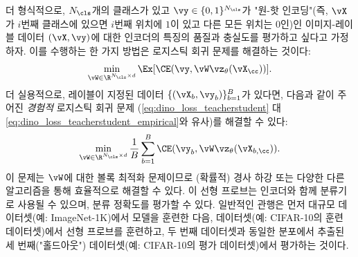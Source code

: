 \documentclass[../../book-main_ko.tex]{subfiles}
\begin{document}
더 형식적으로, \(N_{\cls}\)개의 클래스가 있고 \(\vy \in \{0, 1\}^{N_{\cls}}\)가 "원-핫 인코딩"(즉, \(\vX\)가 \(i\)번째 클래스에 있으면 \(i\)번째 위치에 \(1\)이 있고 다른 모든 위치는 \(0\)인)인 이미지-레이블 데이터 \((\vX, \vy)\)에 대한 인코더의 특징의 품질과 충실도를 평가하고 싶다고 가정하자. 이를 수행하는 한 가지 방법은 로지스틱 회귀 문제를 해결하는 것이다:
\begin{equation}\label{eq:linear_probing}
    \min_{\vW \in \R^{N_{\cls} \times d}}\Ex[\CE(\vy, \vW \vz_{\theta}(\vX_{\cc}))].
\end{equation}
더 실용적으로, 레이블이 지정된 데이터 \(\{(\vX_{b}, \vy_{b})\}_{b = 1}^{B}\)가 있다면, 다음과 같이 주어진 \textit{경험적} 로지스틱 회귀 문제 (\eqref{eq:dino_loss_teacherstudent} 대 \eqref{eq:dino_loss_teacherstudent_empirical}와 유사)를 해결할 수 있다:
\begin{equation}\label{eq:linear_probing_empirical}
    \min_{\vW \in \R^{N_{\cls} \times d}}\frac{1}{B}\sum_{b = 1}^{B}\CE(\vy_{b}, \vW \vz_{\theta}(\vX_{b, \cc})).
\end{equation}
이 문제는 \(\vW\)에 대한 볼록 최적화 문제이므로 (확률적) 경사 하강 또는 다양한 다른 알고리즘을 통해 효율적으로 해결할 수 있다. 이 선형 프로브는 인코더와 함께 분류기로 사용될 수 있으며, 분류 정확도를 평가할 수 있다. 일반적인 관행은 먼저 대규모 데이터셋(예: ImageNet-1K)에서 모델을 훈련한 다음, 데이터셋(예: CIFAR-10의 훈련 데이터셋)에서 선형 프로브를 훈련하고, 두 번째 데이터셋과 동일한 분포에서 추출된 세 번째("홀드아웃") 데이터셋(예: CIFAR-10의 평가 데이터셋)에서 평가하는 것이다.
\end{document}
